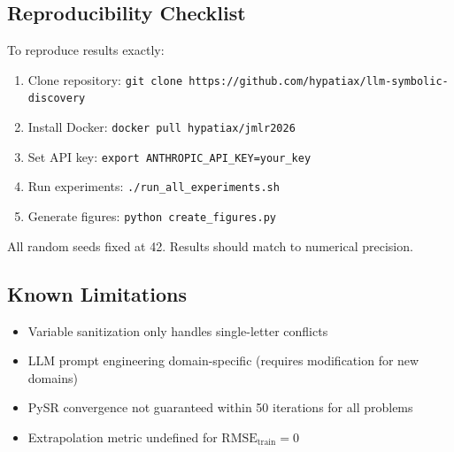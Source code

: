 \subsection{Reproducibility Checklist}

To reproduce results exactly:
\begin{enumerate}
    \item Clone repository: \texttt{git clone https://github.com/hypatiax/llm-symbolic-discovery}
    \item Install Docker: \texttt{docker pull hypatiax/jmlr2026}
    \item Set API key: \texttt{export ANTHROPIC\_API\_KEY=your\_key}
    \item Run experiments: \texttt{./run\_all\_experiments.sh}
    \item Generate figures: \texttt{python create\_figures.py}
\end{enumerate}

All random seeds fixed at 42. Results should match to numerical precision.

\subsection{Known Limitations}

\begin{itemize}
    \item Variable sanitization only handles single-letter conflicts
    \item LLM prompt engineering domain-specific (requires modification for new domains)
    \item PySR convergence not guaranteed within 50 iterations for all problems
    \item Extrapolation metric undefined for $\text{RMSE}_{\text{train}} = 0$
\end{itemize}


